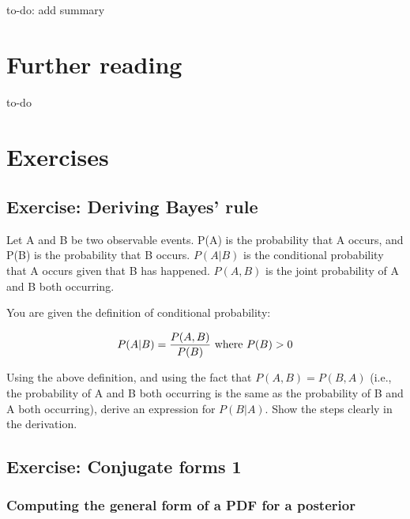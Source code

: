 \documentclass[12pt,]{krantz}
\makeatletter
\newenvironment{kframe}{%
\medskip{}
\setlength{\fboxsep}{.8em}
 \def\at@end@of@kframe{}%
 \ifinner\ifhmode%
  \def\at@end@of@kframe{\end{minipage}}%
  \begin{minipage}{\columnwidth}%
 \fi\fi%
 \def\FrameCommand##1{\hskip\@totalleftmargin \hskip-\fboxsep
 \colorbox{shadecolor}{##1}\hskip-\fboxsep
     \hskip-\linewidth \hskip-\@totalleftmargin \hskip\columnwidth}%
 \MakeFramed {\advance\hsize-\width
   \@totalleftmargin\z@ \linewidth\hsize
   \@setminipage}}%
 {\par\unskip\endMakeFramed%
 \at@end@of@kframe}
\newenvironment{rmdblock}[1]
  {
  \begin{itemize}
  \renewcommand{\labelitemi}{
    \raisebox{-.7\height}[0pt][0pt]{
      {\setkeys{Gin}{width=3em,keepaspectratio}\texttt{[image: images/\#1]}}
    }
  }
  \setlength{\fboxsep}{1em}
  \begin{kframe}
  \item
  }
  {
  \end{kframe}
  \end{itemize}
  }
\newenvironment{rmdnote}
  {\begin{rmdblock}{note}}
  {\end{rmdblock}}
\theoremstyle{definition}
\theoremstyle{definition}
\theoremstyle{definition}
\theoremstyle{remark}
\makeatother
\begin{document}
\begin{rmdnote}
to-do: add summary
\end{rmdnote}

\hypertarget{further-reading-1}{%
\section{Further reading}\label{further-reading-1}}

to-do

\hypertarget{exercises-1}{%
\section{Exercises}\label{exercises-1}}

\hypertarget{exercise-deriving-bayes-rule}{%
\subsection{Exercise: Deriving Bayes' rule}\label{exercise-deriving-bayes-rule}}

Let A and B be two observable events. P(A) is the probability that A occurs, and P(B) is the probability that B occurs. \(P(A|B)\) is the conditional probability that A occurs given that B has happened. \(P(A,B)\) is the joint probability of A and B both occurring.

You are given the definition of conditional probability:

\begin{equation}
P(A|B)= \frac{P(A,B)}{P(B)} \hbox{ where } P(B)>0
\end{equation}

Using the above definition, and using the fact that \(P(A,B)=P(B,A)\) (i.e., the probability of A and B both occurring is the same as the probability of B and A both occurring),
derive an expression for \(P(B|A)\). Show the steps clearly in the derivation.

\hypertarget{exercise-conjugate-forms-1}{%
\subsection{Exercise: Conjugate forms 1}\label{exercise-conjugate-forms-1}}

\hypertarget{computing-the-general-form-of-a-pdf-for-a-posterior}{%
\subsubsection{Computing the general form of a PDF for a posterior}\label{computing-the-general-form-of-a-pdf-for-a-posterior}}
\end{document}

